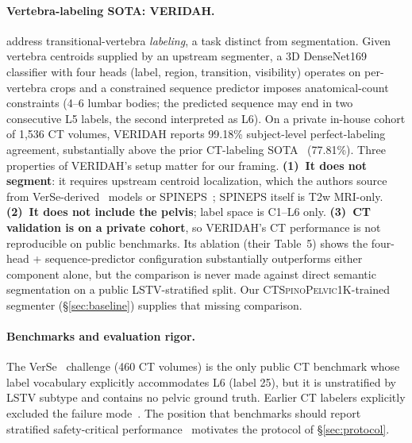 \documentclass{article}
\newcommand{\dataset}{\textsc{CTSpinoPelvic1K}}
\newcommand{\VERIDAH}{VERIDAH}
\newcommand{\VerSe}{VerSe}
\begin{document}
\paragraph{Vertebra-labeling SOTA: \VERIDAH{}.}
\citet{Moller2026VERIDAH:Sequences} address
transitional-vertebra \emph{labeling}, a task distinct
from segmentation. Given vertebra centroids supplied by an
upstream segmenter, a 3D DenseNet169 classifier with four
heads (label, region, transition, visibility) operates on
per-vertebra crops and a constrained sequence predictor
imposes anatomical-count constraints (4--6 lumbar
bodies; the predicted sequence may end in two
consecutive L5 labels, the second interpreted as L6).
On a private
in-house cohort of 1{,}536 CT volumes, \VERIDAH{} reports
99.18\% subject-level perfect-labeling agreement,
substantially above the prior CT-labeling
SOTA~\citep{Meng2023VertebraeCycle} (77.81\%). Three
properties of \VERIDAH{}'s setup matter for our framing.
\textbf{(1)~It does not segment}: it requires upstream
centroid localization, which the authors source from
\VerSe{}-derived~\citep{Sekuboyina2021VerSe:Images} models
or SPINEPS~\citep{Moller2024SPINEPSautomaticSegmentation};
SPINEPS itself is T2w MRI-only.
\textbf{(2)~It does not include the pelvis}; label space
is C1--L6 only.
\textbf{(3)~CT validation is on a private cohort},
so \VERIDAH{}'s CT performance is not reproducible on
public benchmarks. Its ablation (their Table~5) shows the
four-head + sequence-predictor configuration substantially
outperforms either component alone, but the comparison is
never made against direct semantic segmentation on a
public LSTV-stratified split. Our \dataset{}-trained
segmenter (\S\ref{sec:baseline}) supplies that missing
comparison.

\paragraph{Benchmarks and evaluation rigor.}
The \VerSe{}~\citep{Sekuboyina2021VerSe:Images} challenge
(460 CT volumes) is the only public CT benchmark whose
label vocabulary explicitly accommodates L6 (label 25),
but it is unstratified by LSTV subtype and contains no
pelvic ground truth. Earlier CT labelers explicitly
excluded the failure mode~\citep{Sekuboyina2020LabelingAnatomy}.
The position that benchmarks should report stratified
safety-critical
performance~\citep{Maier-Hein2024MetricsValidation}
motivates the protocol of \S\ref{sec:protocol}.

\end{document}
